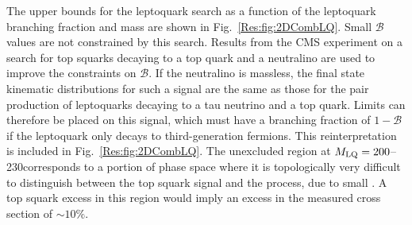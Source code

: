 The upper bounds for the leptoquark search as a function of the leptoquark branching fraction and mass are shown in Fig.~\ref{Res:fig:2DCombLQ}. Small $\mathcal{B}$ values are not constrained by this search. Results from the CMS experiment on a search for top squarks decaying to a top quark and a neutralino \cite{SUS-13-011} are used to improve the constraints on $\mathcal{B}$. If the neutralino is massless, the final state kinematic distributions for such a signal are the same as those for the pair production of leptoquarks decaying to a tau neutrino and a top quark. Limits can therefore be placed on this signal, which must have a branching fraction of $1-\mathcal{B}$ if the leptoquark only decays to third-generation fermions. This reinterpretation is included in Fig.~\ref{Res:fig:2DCombLQ}. The unexcluded region at $M_{\text{LQ}}=200$--230\GeV corresponds to a portion of phase space where it is topologically very difficult to distinguish between the top squark signal and the \ttbar process, due to small \met. A top squark excess in this region would imply an excess in the measured \ttbar cross section of ${\sim}10\%$.

